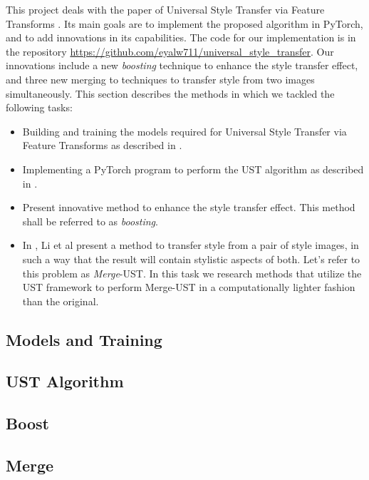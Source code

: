 \hspace{0.5cm} This project deals with the paper of Universal Style Transfer via Feature Transforms \cite{bib11}. Its main goals are to implement the proposed algorithm in PyTorch, and to add innovations in its capabilities. The code for our implementation is in the repository \url{https://github.com/eyalw711/universal_style_transfer}. Our innovations include a new \textit{boosting} technique to enhance the style transfer effect, and three new merging to techniques to transfer style from two images simultaneously. This section describes the methods in which we tackled the following tasks: 
\begin{itemize}
	\item Building and training the models required for Universal Style Transfer via Feature Transforms as described in \cite{bib11}.
	\item Implementing a PyTorch program to perform the UST algorithm as described in \cite{bib11}.
	\item Present innovative method to enhance the style transfer effect. This method shall be referred to as \textit{boosting}.
	\item In \cite{bib11}, Li et al present a method to transfer style from a pair of style images, in such a way that the result will contain stylistic aspects of both. Let's refer to this problem as \textit{Merge}-UST. In this task we research methods that utilize the UST framework to perform Merge-UST in a computationally lighter fashion than the original.
\end{itemize}


\subsection{Models and Training}\label{subsec:Models}
\label{models_methods_lbl}


\subsection{UST Algorithm}
\label{algo_methods_lbl}


\subsection{Boost}
\label{boost_methods_lbl}


\subsection{Merge}
\label{merge_methods_lbl}
